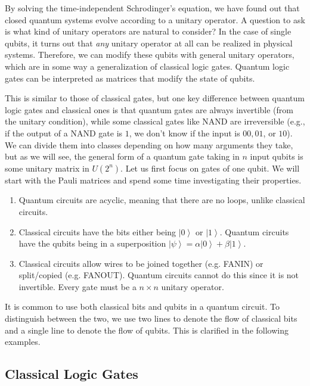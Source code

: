 \documentclass{article}
\newcommand{\ket}[1]{\ensuremath{\left|#1\right\rangle}}
\begin{document}
    By solving the time-independent Schrodinger's equation, we have found out that closed quantum systems evolve according to a unitary operator. A question to ask is what kind of unitary operators are natural to consider? In the case of single qubits, it turns out that \textit{any} unitary operator at all can be realized in physical systems. Therefore, we can modify these qubits with general unitary operators, which are in some way a generalization of classical logic gates. Quantum logic gates can be interpreted as matrices that modify the state of qubits. 

    This is similar to those of classical gates, but one key difference between quantum logic gates and classical ones is that quantum gates are always invertible (from the unitary condition), while some classical gates like NAND are irreversible (e.g., if the output of a NAND gate is $1$, we don't know if the input is $00, 01$, or $10$). We can divide them into classes depending on how many arguments they take, but as we will see, the general form of a quantum gate taking in $n$ input qubits is some unitary matrix in $U(2^n)$. Let us first focus on gates of one qubit. We will start with the Pauli matrices and spend some time investigating their properties.  

    \begin{enumerate} 
      \item Quantum circuits are acyclic, meaning that there are no loops, unlike classical circuits. 
      \item Classical circuits have the bits either being $\ket{0}$ or $\ket{1}$. Quantum circuits have the qubits being in a superposition $\ket{\psi} = \alpha \ket{0} + \beta \ket{1}$. 
      \item Classical circuits allow wires to be joined together (e.g. FANIN) or split/copied (e.g. FANOUT). Quantum circuits cannot do this since it is not invertible. Every gate must be a $n \times n$ unitary operator.
    \end{enumerate}
    
    It is common to use both classical bits and qubits in a quantum circuit. To distinguish between the two, we use two lines to denote the flow of classical bits and a single line to denote the flow of qubits. This is clarified in the following examples. 

  \subsection{Classical Logic Gates} 
\end{document}
